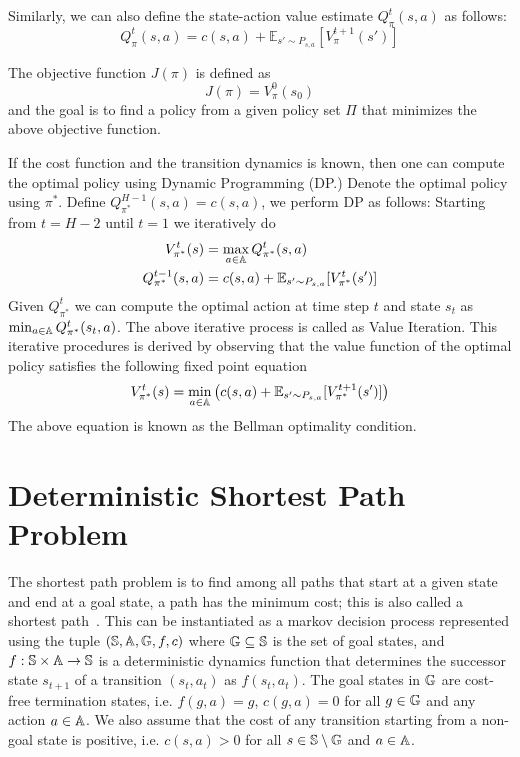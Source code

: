 Similarly, we can also define the state-action value estimate
$Q_\pi^t(s, a)$ as follows:
\begin{equation}
  \label{eq:4}
  Q_\pi^t(s, a) = c(s, a) + \mathbb{E}_{s' \sim P_{s,a}}[V_\pi^{t+1}(s')]
\end{equation}

The objective function $J(\pi)$ is defined as
\begin{equation}
  \label{eq:6}
  J(\pi) = V_\pi^0(s_0)
\end{equation}
and the goal is to find a policy from a given policy set $\Pi$ that
minimizes the above objective function.

If the cost function and the transition dynamics is known, then one
can compute the optimal policy using Dynamic Programming (DP.) Denote
the optimal policy using $\pi^*$. Define $Q_{\pi^*}^{H-1}(s, a) = c(s,
a)$, we perform DP as follows: Starting from $t = H-2$ until $t = 1$
we iteratively do
\begin{align}
  V_{\pi^*}^t(s) &= \max_{a \in \mathbb{A}} Q_{\pi^*}^t(s, a) \\
  Q_{\pi^*}^{t-1}(s, a) &= c(s, a) + \mathbb{E}_{s' \sim P_{s, a}}[V_{\pi^*}^t(s')]
\end{align}
Given $Q_{\pi^*}^t$ we can compute the optimal action at time step $t$
and state $s_t$ 
as $\min_{a \in \mathbb{A}} Q_{\pi^*}^t(s_t, a)$. The above
iterative process is called as Value Iteration. This iterative
procedures is derived by observing that the value function of the
optimal policy satisfies the following fixed point equation
\begin{equation}
  \label{eq:8}
  V_{\pi^*}^t(s) = \min_{a \in \mathbb{A}} \left( c(s, a) + \mathbb{E}_{s'
  \sim P_{s,a}}[V_{\pi^*}^{t+1}(s')]\right)
\end{equation}
The above equation is known as the Bellman optimality condition.

\section{Deterministic Shortest Path Problem}
\label{sec:determ-short-path}

The shortest path problem is to find among all paths that start at a
given state and end at a goal state, a path has the minimum cost; this
is also called a shortest path~\cite{bertsekas1995neuro}. This can be instantiated as a markov
decision process represented using the tuple $(\mathbb{S},
\mathbb{A}, \mathbb{G}, f, c)$ where $\mathbb{G} \subseteq
\mathbb{S}$ is the set of goal states, and $f:\mathbb{S} \times
\mathbb{A} \rightarrow \mathbb{S}$ is a deterministic
dynamics function that determines the successor state $s_{t+1}$ of a
transition $(s_t, a_t)$ as $f(s_t, a_t)$. The goal states in
$\mathbb{G}$ are cost-free termination states, i.e. $f(g, a) = g$, $c(g,
a) = 0$ for
all $g \in \mathbb{G}$ and any action $a \in \mathbb{A}$. We also
assume that the cost of any transition starting from a non-goal state
is positive, i.e. $c(s, a) > 0$ for all $s \in \mathbb{S} \setminus
\mathbb{G}$ and $a \in \mathbb{A}$.

